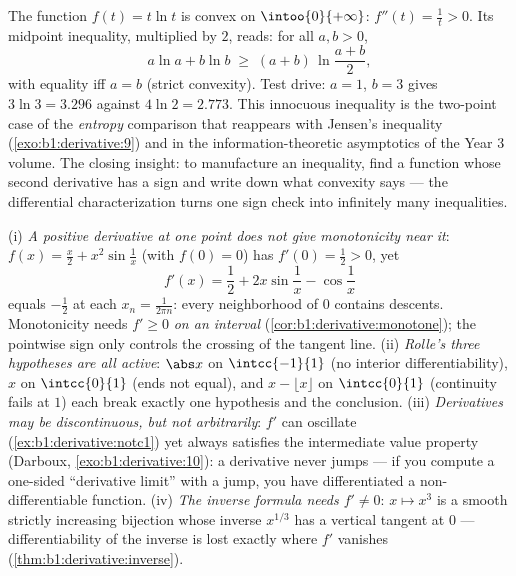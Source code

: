 \begin{example}\label{ex:b1:derivative:xlnx}
The function $f(t) = t\ln t$ is convex on $\intoo{0}{+\infty}$:
$f''(t) = \frac1t > 0$. Its midpoint inequality, multiplied by
$2$, reads: for all $a, b > 0$,
\[
a\ln a + b\ln b \;\geq\; (a + b)\,\ln\frac{a + b}{2} ,
\]
with equality iff $a = b$ (strict convexity). Test drive: $a =
1$, $b = 3$ gives $3\ln 3 = 3.296$ against $4\ln 2 = 2.773$.
This innocuous inequality is the two-point case of the
\emph{entropy} comparison that reappears with Jensen's
inequality (\cref{exo:b1:derivative:9}) and in the
information-theoretic asymptotics of the Year 3 volume. The
closing insight: to manufacture an inequality, find a function
whose second derivative has a sign and write down what convexity
says --- the differential characterization turns one sign check
into infinitely many inequalities.
\end{example}

\begin{remark}
(i) \emph{A positive derivative at one point does not give
monotonicity near it}: $f(x) = \frac x2 + x^2\sin\frac1x$ (with
$f(0) = 0$) has $f'(0) = \frac12 > 0$, yet
\[
f'(x) = \frac12 + 2x\sin\frac1x - \cos\frac1x
\]
equals $-\frac12$ at each $x_n = \frac{1}{2\pi n}$: every
neighborhood of $0$ contains descents. Monotonicity needs $f'
\geq 0$ \emph{on an interval}
(\cref{cor:b1:derivative:monotone}); the pointwise sign only
controls the crossing of the tangent line. (ii) \emph{Rolle's
three hypotheses are all active}: $\abs x$ on $\intcc{-1}{1}$
(no interior differentiability), $x$ on $\intcc{0}{1}$ (ends not
equal), and $x - \lfloor x\rfloor$ on $\intcc{0}{1}$ (continuity
fails at $1$) each break exactly one hypothesis and the
conclusion. (iii) \emph{Derivatives may be discontinuous, but
not arbitrarily}: $f'$ can oscillate
(\cref{ex:b1:derivative:notc1}) yet always satisfies the
intermediate value property (Darboux,
\cref{exo:b1:derivative:10}): a derivative never jumps --- if
you compute a one-sided ``derivative limit'' with a jump, you
have differentiated a non-differentiable function. (iv) \emph{The
inverse formula needs $f' \neq 0$}: $x \mapsto x^3$ is a smooth
strictly increasing bijection whose inverse $x^{1/3}$ has a
vertical tangent at $0$ --- differentiability of the inverse is
lost exactly where $f'$ vanishes
(\cref{thm:b1:derivative:inverse}).
\end{remark}

